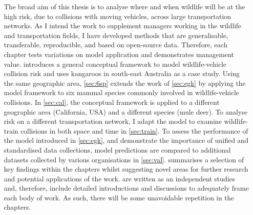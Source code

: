 The broad aim of this thesis is to analyse where and when wildlife will be at the high risk, due to collisions with moving vehicles, across large transportation networks. As I intend the work to supplement managers working in the wildlife and transportation fields, I have developed methods that are generalisable, transferable, reproducible, and based on open-source data. Therefore, each chapter tests variations on model application and demonstrates management value.  introduces a general conceptual framework to model wildlife-vehicle collision risk and uses kangaroos in south-east Australia as a case study. Using the same geographic area, \cref{sec:6sp} extends the work of \cref{sec:egk} by applying the model framework to six mammal species commonly involved in wildlife-vehicle collisions. In \cref{sec:cal}, the conceptual framework is applied to a different geographic area (California, USA) and a different species (mule deer). To analyse risk on a different transportation network, I adapt the model to examine wildlife-train collisions in both space and time in \cref{sec:train}. To assess the performance of the model introduced in \cref{sec:egk}, and demonstrate the importance of unified and standardised data collections, model predictions are compared to additional datasets collected by various organisations in \cref{sec:val}.  summarises a selection of key findings within the chapters whilst suggesting novel areas for further research and potential applications of the work.  are written as an independent studies and, therefore, include detailed introductions and discussions to adequately frame each body of work. As such, there will be some unavoidable repetition in the chapters.